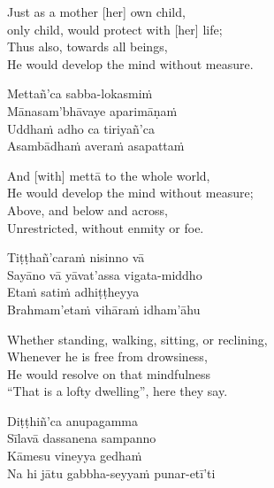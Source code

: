 \begin{english-verses}
  Just as a mother [her] own child,\\\relax
  [Her] only child, would protect with [her] life; \\
  Thus also, towards all beings,\\
  He would develop the mind without measure.
\end{english-verses}

\begin{pali-hang-continued}
  Mettañ'ca sabba-lokasmiṁ\\
  Mānasam'bhāvaye aparimāṇaṁ\\
  Uddhaṁ adho ca tiriyañ'ca\\
  Asambādhaṁ averaṁ asapattaṁ
\end{pali-hang-continued}

\begin{english-verses}
  And [with] mettā to the whole world,\\
  He would develop the mind without measure;\\
  Above, and below and across,\\
  Unrestricted, without enmity or foe.
\end{english-verses}

\begin{pali-hang-continued}
  Tiṭṭhañ'caraṁ nisinno vā\\
  Sayāno vā yāvat'assa vigata-middho\\
  Etaṁ satiṁ adhiṭṭheyya\\
  Brahmam'etaṁ vihāraṁ idham'āhu
\end{pali-hang-continued}

\ifbfive\clearpage\fi
\ifafive\clearpage\fi

\begin{english-verses}
  Whether standing, walking, sitting, or reclining,\\
  Whenever he is free from drowsiness,\\
  He would resolve on that mindfulness\\
  ``That is a lofty dwelling'', here they say.
\end{english-verses}

\begin{pali-hang-continued}
  Diṭṭhiñ'ca anupagamma\\
  Sīlavā dassanena sampanno\\
  Kāmesu vineyya gedhaṁ\\
  Na hi jātu gabbha-seyyaṁ punar-etī'ti
\end{pali-hang-continued}

